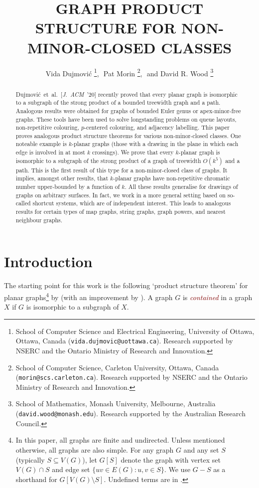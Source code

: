 \documentclass{patmorin}
\title{\MakeUppercase{Graph Product Structure for Non-Minor-Closed Classes}}
\author{%
Vida Dujmovi\'c%
\thanks{School of Computer Science and Electrical Engineering, University of Ottawa, Ottawa, Canada (\texttt{vida.dujmovic@uottawa.ca}). Research supported by NSERC and the Ontario Ministry of Research and Innovation.},\,\,
Pat Morin%
\thanks{School of Computer Science, Carleton University, Ottawa, Canada (\texttt{morin@scs.carleton.ca}). Research  supported by NSERC and the Ontario Ministry of Research and Innovation.},\,\, and
David R. Wood%
\thanks{School of Mathematics, Monash University, Melbourne, Australia (\texttt{david.wood@monash.edu}). Research supported by the Australian Research Council.}
}
\theoremstyle{plain}
\theoremstyle{definition}
\newcommand{\defin}[1]{\textcolor{Maroon}{\emph{#1}}}
\begin{document}
\begin{titlepage}
\maketitle

\begin{abstract}
Dujmovi\'c~et~al.~[\emph{J.~ACM}~'20] recently proved that every planar graph is isomorphic to a subgraph of the strong product of a bounded treewidth graph and a path. Analogous results were obtained for graphs of bounded Euler genus or apex-minor-free graphs. These tools have been used to solve longstanding problems on queue layouts, non-repetitive colouring, $p$-centered colouring, and adjacency labelling. This paper proves analogous product structure theorems for various non-minor-closed classes. One noteable example is $k$-planar graphs (those with a drawing in the plane in which each edge is involved in at most $k$ crossings). We prove that every $k$-planar graph is isomorphic to a subgraph of the strong product of a graph of treewidth $O(k^5)$ and a path. This is the first result of this type for a non-minor-closed class of graphs. It implies, amongst other results, that $k$-planar graphs have non-repetitive chromatic number upper-bounded by a function of $k$. All these results generalise for drawings of graphs on arbitrary surfaces. In fact, we work in a more general setting based on so-called shortcut systems, which are of independent interest. This leads to analogous results for certain types of map graphs, string graphs, graph powers, and nearest neighbour graphs.
\end{abstract}
\end{titlepage}
\tableofcontents
\newpage

\section{Introduction}
\label{Introduction}

The starting point for this work is the following `product structure theorem' for planar graphs\footnote{In this paper, all graphs are finite and undirected. Unless mentioned otherwise, all graphs are also simple. For any graph $G$ and any set $S$ (typically $S\subseteq V(G)$), let $G[S]$  denote the graph with vertex set $V(G)\cap S$ and edge set $\{uv\in E(G) : u,v\in S\}$.  We use $G-S$ as a shorthand for $G[V(G)\setminus S]$. Undefined terms are in \citep{Diestel5}.} by \citet{DJMMUW20} (with an improvement by \citet{UWY22}). A graph $G$ is \defin{contained} in a graph $X$ if $G$ is isomorphic to a subgraph of $X$.
\end{document}
